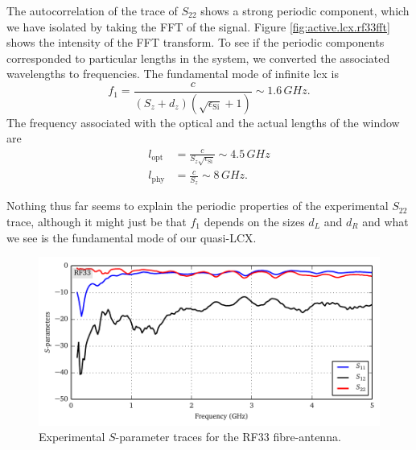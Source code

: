The autocorrelation of the trace of $S_{22}$ shows a strong
periodic component, which we have isolated by taking the 
FFT of the signal. 
Figure \ref{fig:active.lcx.rf33fft} shows the intensity
of the FFT transform. To see if the periodic components corresponded
to particular lengths in the system, we converted the associated
wavelengths to frequencies. 
The fundamental mode of infinite \gls{lcx} \cite{WAN2001} is
  \begin{equation}
   f_1 = \frac{c}{\left(S_z+d_z\right)\left(\sqrt{\epsilon_\text{Si}}+1\right)} \sim 1.6\,\unit{GHz}.
  \end{equation}
The frequency associated with the optical and the actual lengths of the window
are
  \begin{align*}
   l_\text{opt}	&= \frac{c}{S_z\sqrt{\epsilon_\text{Si}}} \sim 4.5\,\unit{GHz}	\\
   l_\text{phy}	&= \frac{c}{S_z} \sim 8\,\unit{GHz}.
  \end{align*}

Nothing thus far seems to explain the periodic properties of the 
experimental $S_{22}$ trace, although it might just be that 
$f_1$ depends on the sizes $d_L$ and $d_R$ and what we see is
the fundamental mode of our quasi-LCX. 

\begin{figure}
 \centering
 \includegraphics{figs/active/RF33-sParameters.pdf}
 \caption[Experimental $S$-parameter traces for the RF33 fibre-antenna]
 		{Experimental $S$-parameter traces for the RF33 fibre-antenna.}
 \label{fig:active.lcx.rf33sParameters}
\end{figure}

